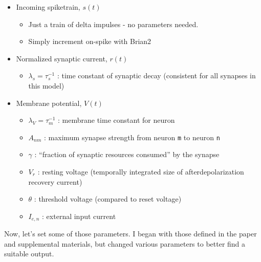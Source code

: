 \documentclass[11pt]{article}
\providecommand{\tightlist}{%
      \setlength{\itemsep}{0pt}\setlength{\parskip}{0pt}}
\begin{document}
\begin{itemize}
\tightlist
\item
  Incoming spiketrain, \(s(t)\)

  \begin{itemize}
  \tightlist
  \item
    Just a train of delta impulses - no parameters needed.
  \item
    Simply increment on-spike with Brian2
  \end{itemize}
\item
  Normalized synaptic current, \(r(t)\)

  \begin{itemize}
  \tightlist
  \item
    \(\lambda_s = \tau_s^{-1}\) : time constant of synaptic decay
    (consistent for all synapses in this model)
  \end{itemize}
\item
  Membrane potential, \(V(t)\)

  \begin{itemize}
  \tightlist
  \item
    \(\lambda_V = \tau_m^{-1}\) : membrane time constant for neuron
  \item
    \(A_{nm}\) : maximum synapse strength from neuron \texttt{m} to
    neuron \texttt{n}
  \item
    \(\gamma\) : ``fraction of synaptic resources consumed'' by the
    synapse
  \item
    \(V_r\) : resting voltage (temporally integrated size of
    afterdepolarization recovery current)
  \item
    \(\theta\) : threshold voltage (compared to reset voltage)
  \item
    \(I_{e,n}\) : external input current
  \end{itemize}
\end{itemize}

Now, let's set some of those parameters. I began with those defined in
the paper and supplemental materials, but changed various parameters to
better find a suitable output.
\end{document}
